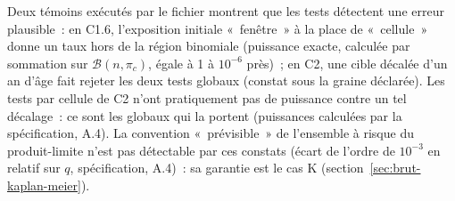 \documentclass[a4paper,11pt]{article}
\begin{document}
Deux témoins exécutés par le fichier montrent que les tests détectent une
erreur plausible~: en C1.6, l'exposition initiale «~fenêtre~» à la place de
«~cellule~» donne un taux hors de la région binomiale (puissance exacte,
calculée par sommation sur $\mathcal{B}(n, \pi_c)$, égale à 1 à $10^{-6}$
près)~; en C2, une cible décalée d'un an d'âge fait rejeter les deux tests
globaux (constat sous la graine déclarée). Les tests par cellule de C2 n'ont
pratiquement pas de puissance contre un tel décalage~: ce sont les globaux
qui la portent (puissances calculées par la spécification, A.4). La
convention «~prévisible~» de l'ensemble à risque du produit-limite n'est pas
détectable par ces constats (écart de l'ordre de $10^{-3}$ en relatif sur
$q$, spécification, A.4)~: sa garantie est le cas K
(section~\ref{sec:brut-kaplan-meier}).
\end{document}
